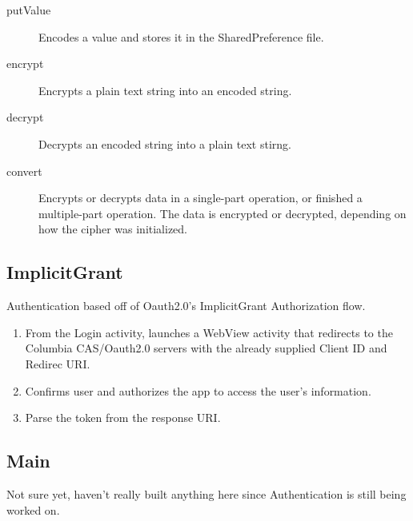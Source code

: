 \documentclass{article}
\begin{document}
\begin{description}
    \item[putValue]         Encodes a value and stores it in the SharedPreference file.
    \item[encrypt]          Encrypts a plain text string into an encoded string.
    \item[decrypt]          Decrypts an encoded string into a plain text stirng.
    \item[convert]          Encrypts or decrypts data in a single-part operation, or 
                            finished a multiple-part operation. The data is encrypted or 
                            decrypted, depending on how the cipher was initialized.
\end{description}
 
\subsection{ImplicitGrant}
Authentication based off of Oauth2.0's ImplicitGrant Authorization flow. 
\begin{enumerate}
    \item   From the Login activity, launches a WebView activity that redirects to the 
            Columbia CAS/Oauth2.0 servers with the already supplied Client ID and Redirec 
            URI.
    \item   Confirms user and authorizes the app to access the user's information.
    \item   Parse the token from the response URI.
\end{enumerate}

\subsection{Main}
Not sure yet, haven't really built anything here since Authentication is still being 
worked on.

\end{document}
